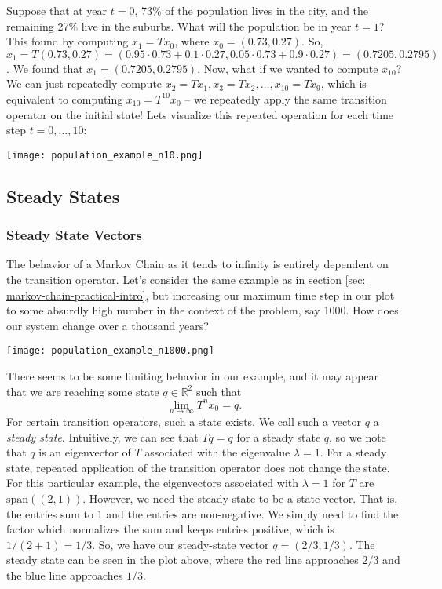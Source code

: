 \documentclass{article}
\newcommand{\spans}{\mathrm{span}}
\newcommand{\R}{\mathbb{R}}
\theoremstyle{definition}
\begin{document}
Suppose that at year $t = 0$, 73\% of the population lives in the city, and the remaining 27\% live in the suburbs. What will the population be in year $t = 1$? This found by computing $x_1 = Tx_0$, where $x_0 = (0.73, 0.27)$. So, $x_1 = T(0.73, 0.27) = (0.95 \cdot 0.73 + 0.1 \cdot 0.27, 0.05 \cdot 0.73 + 0.9 \cdot 0.27) = (0.7205, 0.2795)$. We found that $x_1 = (0.7205, 0.2795)$. Now, what if we wanted to compute $x_{10}$? We can just repeatedly compute $x_2 = Tx_1, x_3 = Tx_2, \dots, x_{10} = Tx_9$, which is equivalent to computing $x_{10} = T^{10}x_0$ -- we repeatedly apply the same transition operator on the initial state! Lets visualize this repeated operation for each time step $t = 0, \dots, 10$:
\begin{center}
    \texttt{[image: population\_example\_n10.png]}
\end{center}

\subsection{Steady States}

\subsubsection{Steady State Vectors}

The behavior of a Markov Chain as it tends to infinity is entirely dependent on the transition operator. Let's consider the same example as in section \ref{sec: markov-chain-practical-intro}, but increasing our maximum time step in our plot to some absurdly high number in the context of the problem, say 1000. How does our system change over a thousand years?
\begin{center}
    \texttt{[image: population\_example\_n1000.png]}
\end{center}
There seems to be some limiting behavior in our example, and it may appear that we are reaching some state $q \in \R^2$ such that $$\lim_{n \to \infty}T^nx_0 = q.$$ For certain transition operators, such a state exists. We call such a vector $q$ a \textit{steady state}. Intuitively, we can see that $Tq = q$ for a steady state $q$, so we note that $q$ is an eigenvector of $T$ associated with the eigenvalue $\lambda = 1$. For a steady state, repeated application of the transition operator does not change the state. For this particular example, the eigenvectors associated with $\lambda = 1$ for $T$ are $\spans((2, 1))$. However, we need the steady state to be a state vector. That is, the entries sum to $1$ and the entries are non-negative. We simply need to find the factor which normalizes the sum and keeps entries positive, which is $1/(2 + 1) = 1/3$. So, we have our steady-state vector $q = (2/3, 1/3)$. The steady state can be seen in the plot above, where the red line approaches $2/3$ and the blue line approaches $1/3$.
\end{document}
